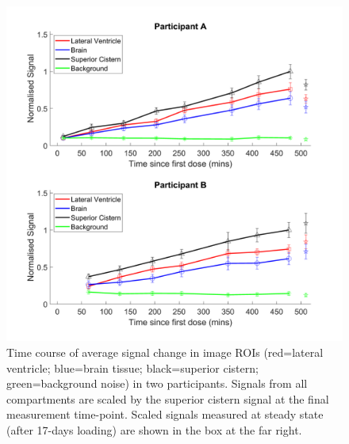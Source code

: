 \documentclass[class=article, crop=false]{standalone}
\begin{document}
\begin{figure}
    \centering
    \includegraphics[width=1\textwidth]{Figures/D2O/ROI_Graph.png}
    \caption{Time course of average signal change in image ROIs (red=lateral ventricle; blue=brain tissue; black=superior cistern; green=background noise) in two participants. Signals from all compartments are scaled by the superior cistern signal at the final measurement time-point. Scaled signals measured at steady state (after 17-days loading) are shown in the box at the far right.}
    \label{fig:D2O:ROI_Graph}
\end{figure}
\end{document}
